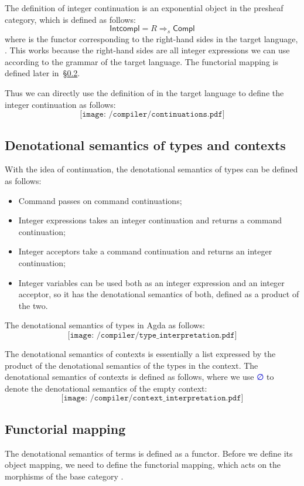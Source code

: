 \documentclass[12pt,a4paper]{report}
\theoremstyle{definition}
\newcommand{\secref}[1]{\S\ref{#1}}
\newcommand{\mb}[1]{\textcolor{mediumblue}{#1}}
\begin{document}
    The definition of integer continuation is an exponential object in the presheaf category, which is defined as follows:
    \[\mathsf{Intcompl} = R \Rightarrow_s \mathsf{Compl} \]
    where  is the functor corresponding to the right-hand sides in the target language, . This works because the right-hand sides are all integer expressions we can use according to the grammar of the target language. The functorial mapping is defined later in~\secref{subsec: functorial_mapping}.
    
    Thus we can directly use the definition of  in the target language to define the integer continuation as follows:
    \[\texttt{[image: /compiler/continuations.pdf]}\]

    \subsection{Denotational semantics of types and contexts} \label{subsec: type_interpretation}
    With the idea of continuation, the denotational semantics of types can be defined as follows:
    \begin{itemize}
        \item Command passes on command continuations;
        \item Integer expressions takes an integer continuation and returns a command continuation;
        \item Integer acceptors take a command continuation and returns an integer continuation;
        \item Integer variables can be used both as an integer expression and an integer acceptor, so it has the denotational semantics of both, defined as a product of the two.
    \end{itemize}
    
    The denotational semantics of types in Agda as follows:
    \[\texttt{[image: /compiler/type\_interpretation.pdf]}\]

    The denotational semantics of contexts is essentially a list expressed by the product of the denotational semantics of the types in the context. The denotational semantics of contexts is defined as follows, where we use \mb{∅} to denote the denotational semantics of the empty context:
    \[\texttt{[image: /compiler/context\_interpretation.pdf]}\]

    \subsection{Functorial mapping} \label{subsec: functorial_mapping}
    The denotational semantics of terms is defined as a functor. Before we define its object mapping, we need to define the functorial mapping, which acts on the morphisms of the base category \text{\Upsigma}. 
\end{document}
